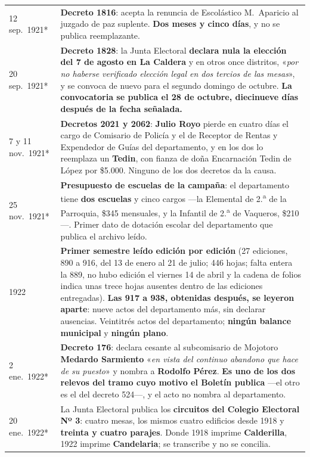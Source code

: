 \begin{longtable}{@{}p{2.7cm}p{10.3cm}@{}}
12 sep.\ 1921* & \textbf{Decreto 1816}: acepta la renuncia de Escolástico M.\ Aparicio\index{Aparicio, Escolástico M.} al juzgado de paz suplente. \textbf{Dos meses y cinco días}, y no se publica reemplazante. \\
20 sep.\ 1921* & \textbf{Decreto 1828}: la Junta Electoral \textbf{declara nula la elección del 7 de agosto en La Caldera} y en otros once distritos, «\textit{por no haberse verificado elección legal en dos tercios de las mesas}», y se convoca de nuevo para el segundo domingo de octubre. \textbf{La convocatoria se publica el 28 de octubre, diecinueve días después de la fecha señalada.} \\
7 y 11 nov.\ 1921* & \textbf{Decretos 2021 y 2062}: \textbf{Julio Royo} pierde en cuatro días el cargo de Comisario de Policía y el de Receptor de Rentas y Expendedor de Guías del departamento, y en los dos lo reemplaza un \textbf{Tedin}, con fianza de doña Encarnación Tedin de López por \$5.000. Ninguno de los dos decretos da la causa. \\
25 nov.\ 1921* & \textbf{Presupuesto de escuelas de la campaña}: el departamento tiene \textbf{dos escuelas} y cinco cargos ---la Elemental de 2.\textsuperscript{a} de la Parroquia, \$345 mensuales, y la Infantil de 2.\textsuperscript{a} de Vaqueros, \$210---. Primer dato de dotación escolar del departamento que publica el archivo leído. \\
1922 & \textbf{Primer semestre leído edición por edición} (27 ediciones, 890 a 916, del 13 de enero al 21 de julio; 446 hojas; falta entera la 889, no hubo edición el viernes 14 de abril y la cadena de folios indica unas trece hojas ausentes dentro de las ediciones entregadas). \textbf{Las 917 a 938, obtenidas después, se leyeron aparte}: nueve actos del departamento más, sin declarar ausencias. Veintitrés actos del departamento; \textbf{ningún balance municipal} y \textbf{ningún plano}. \\
2 ene.\ 1922* & \textbf{Decreto 176}: declara cesante al subcomisario de Mojotoro \textbf{Medardo Sarmiento} «\textit{en vista del continuo abandono que hace de su puesto}» y nombra a \textbf{Rodolfo Pérez}. \textbf{Es uno de los dos relevos del tramo cuyo motivo el Boletín publica} ---el otro es el del decreto 524---, y el acto no nombra al departamento. \\
20 ene.\ 1922* & La Junta Electoral publica los \textbf{circuitos del Colegio Electoral Nº 3}: cuatro mesas, los mismos cuatro edificios desde 1918 y \textbf{treinta y cuatro parajes}. Donde 1918 imprime \textbf{Calderilla}, 1922 imprime \textbf{Candelaria}; se transcribe y no se concilia. \\

\end{longtable}
